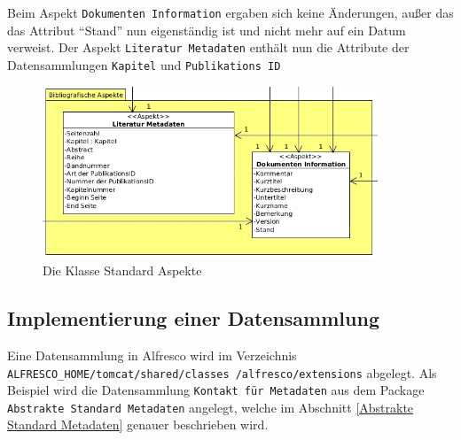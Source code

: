Beim Aspekt \texttt{Dokumenten Information} ergaben sich keine \"Anderungen, au\ss{}er das das Attribut "`Stand"' nun eigenst\"andig ist und nicht mehr auf ein Datum verweist. Der Aspekt \texttt{Literatur Metadaten} enth\"alt nun die Attribute der Datensammlungen \texttt{Kapitel} und \texttt{Publikations ID}

\begin{figure}[!ht]
\centering
\includegraphics[width=10cm]{Bilder/AlfrescoModell/Bibliografische-Aspekte.jpg}
\caption{Die Klasse Standard Aspekte}
\label{Klasse Bibligrafische Aspekte}
\centering
\end{figure}

\FloatBarrier
\subsection{Implementierung einer Datensammlung}
Eine Datensammlung in Alfresco wird im Verzeichnis \texttt{ALFRESCO\_HOME/tomcat/shared/classes
/alfresco/extensions} abgelegt.
Als Beispiel wird die Datensammlung \texttt{Kontakt f\"ur Metadaten} aus dem Package \texttt{Abstrakte Standard Metadaten} angelegt, welche im Abschnitt \ref{Abstrakte Standard Metadaten} genauer beschrieben wird.

